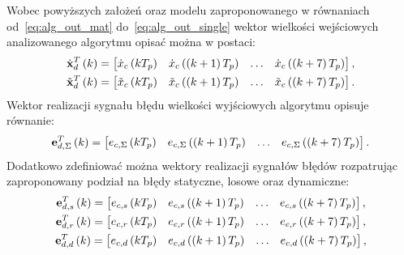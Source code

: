 Wobec powyższych założeń oraz modelu zaproponowanego w równaniach od~\eqref{eq:alg_out_mat} do~\eqref{eq:alg_out_single} wektor wielkości wejściowych analizowanego algorytmu opisać można w postaci:
\begin{gather}
\dot{\mathbf{x}}_{d}^{T} \left(k\right) =
\begin{bmatrix}
\dot{x}_{c} \left(kT_{p}\right) & \dot{x}_{c} \left( \left(k+1\right) T_{p} \right) & \hdots & \dot{x}_{c} \left( \left(k+7\right) T_{p} \right)
\end{bmatrix}
\label{eq:sym_partd_input_ideal}, \\
\tilde{\mathbf{x}}_{d}^{T} \left(k\right) =
\begin{bmatrix}
\tilde{x}_{c} \left(kT_{p}\right) & \tilde{x}_{c} \left( \left(k+1\right) T_{p} \right) & \hdots & \tilde{x}_{c} \left( \left(k+7\right) T_{p} \right)
\end{bmatrix}
\label{eq:sym_partd_input_real}.
\end{gather}
Wektor realizacji sygnału błędu wielkości wyjściowych algorytmu opisuje równanie:
\begin{equation}
\mathbf{e}_{d,\Sigma}^{T} \left(k\right) =
\begin{bmatrix}
e_{c,\Sigma} \left(kT_{p}\right) & e_{c,\Sigma} \left( \left(k+1\right) T_{p} \right) & \hdots & e_{c,\Sigma} \left( \left(k+7\right) T_{p} \right)
\end{bmatrix}
\label{eq:sym_partd_input_error_sum}.
\end{equation}
Dodatkowo zdefiniować można wektory realizacji sygnałów błędów rozpatrując zaproponowany podział na błędy statyczne, losowe oraz dynamiczne:
\begin{gather}
\mathbf{e}_{d,s}^{T} \left(k\right) =
\begin{bmatrix}
e_{c,s} \left(kT_{p}\right) & e_{c,s} \left( \left(k+1\right) T_{p} \right) & \hdots & e_{c,s} \left( \left(k+7\right) T_{p} \right)
\end{bmatrix}
\label{eq:sym_partd_input_error_stat}, \\
\mathbf{e}_{d,r}^{T} \left(k\right) =
\begin{bmatrix}
e_{c,r} \left(kT_{p}\right) & e_{c,r} \left( \left(k+1\right) T_{p} \right) & \hdots & e_{c,r} \left( \left(k+7\right) T_{p} \right)
\end{bmatrix}
\label{eq:sym_partd_input_error_rand}, \\
\mathbf{e}_{d,d}^{T} \left(k\right) =
\begin{bmatrix}
e_{c,d} \left(kT_{p}\right) & e_{c,d} \left( \left(k+1\right) T_{p} \right) & \hdots & e_{c,d} \left( \left(k+7\right) T_{p} \right)
\end{bmatrix}
\label{eq:sym_partd_input_error_dyn},
\end{gather}
